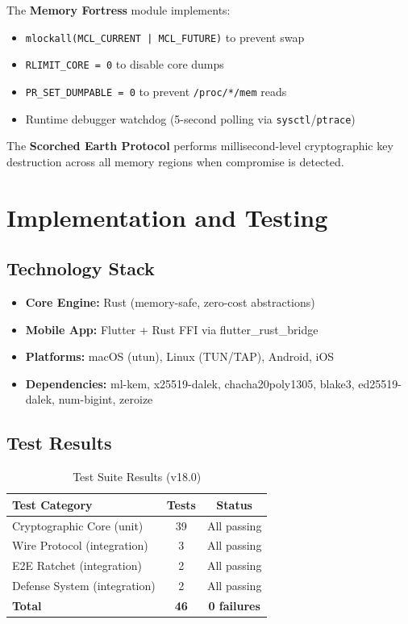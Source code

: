 \documentclass[11pt,a4paper]{article}
\begin{document}
The \textbf{Memory Fortress} module implements:
\begin{itemize}[nosep]
  \item \texttt{mlockall(MCL\_CURRENT | MCL\_FUTURE)} to prevent swap
  \item \texttt{RLIMIT\_CORE = 0} to disable core dumps
  \item \texttt{PR\_SET\_DUMPABLE = 0} to prevent \texttt{/proc/*/mem} reads
  \item Runtime debugger watchdog (5-second polling via
    \texttt{sysctl}/\texttt{ptrace})
\end{itemize}

The \textbf{Scorched Earth Protocol} performs millisecond-level
cryptographic key destruction across all memory regions when compromise
is detected.

\section{Implementation and Testing}
\label{sec:implementation}

\subsection{Technology Stack}

\begin{itemize}[nosep]
  \item \textbf{Core Engine:} Rust (memory-safe, zero-cost abstractions)
  \item \textbf{Mobile App:} Flutter + Rust FFI via flutter\_rust\_bridge
  \item \textbf{Platforms:} macOS (utun), Linux (TUN/TAP), Android, iOS
  \item \textbf{Dependencies:} ml-kem, x25519-dalek, chacha20poly1305,
    blake3, ed25519-dalek, num-bigint, zeroize
\end{itemize}

\subsection{Test Results}

\begin{table}[h]
\centering
\caption{Test Suite Results (v18.0)}
\begin{tabular}{@{}lcc@{}}
\toprule
\textbf{Test Category} & \textbf{Tests} & \textbf{Status} \\
\midrule
Cryptographic Core (unit)      & 39 & All passing \\
Wire Protocol (integration)    & 3  & All passing \\
E2E Ratchet (integration)      & 2  & All passing \\
Defense System (integration)   & 2  & All passing \\
\midrule
\textbf{Total}                 & \textbf{46} & \textbf{0 failures} \\
\bottomrule
\end{tabular}
\end{table}
\end{document}
